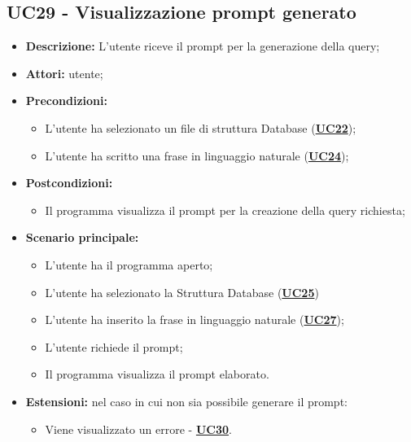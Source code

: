 \subsection{UC29 - Visualizzazione prompt generato}
\label{sec:UC29}
\begin{itemize}
	\item \textbf{Descrizione:} L’utente riceve il prompt per la generazione della query;
	\item \textbf{Attori:} utente;
	\item \textbf{Precondizioni:} 
	\begin{itemize}
		\item L’utente ha selezionato un file di struttura Database (\hyperref[sec:UC25]{\textbf{UC22}});
		\item L’utente ha scritto una frase in linguaggio naturale (\hyperref[sec:UC27]{\textbf{UC24}});
	\end{itemize}
	\item \textbf{Postcondizioni:} 
	\begin{itemize}
		\item Il programma visualizza il prompt per la creazione della query richiesta;
	\end{itemize}
	\item \textbf{Scenario principale:} 
	\begin{itemize}
		\item L’utente ha il programma aperto;
		\item L’utente ha selezionato la Struttura Database (\hyperref[sec:UC25]{\textbf{UC25}})
		\item L'utente ha inserito la frase in linguaggio naturale (\hyperref[sec:UC27]{\textbf{UC27}});
		\item L’utente richiede il prompt;
		\item Il programma visualizza il prompt elaborato.
	\end{itemize}
	\item \textbf{Estensioni:} nel caso in cui non sia possibile generare il prompt:
	\begin{itemize}
		\item Viene visualizzato un errore - \hyperref[sec:UC30]{\textbf{UC30}}.
	\end{itemize}
\end{itemize}

